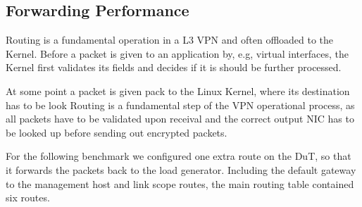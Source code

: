 \documentclass[IN,11pt,twoside,openright,master,english]{tumthesis}
\begin{document}
\subsection{Forwarding Performance}

Routing is a fundamental operation in a L3 VPN and often offloaded to the Kernel. Before a packet is given to an application by, e.g, virtual interfaces, the Kernel first validates its fields and decides if it is should be further processed.

At some point a packet is given pack to the Linux Kernel, where its destination has to be look
Routing is a fundamental step of the VPN operational process, as all packets have to be validated upon receival and the correct output NIC has to be looked up before sending out encrypted packets.

For the following benchmark we configured one extra route on the DuT, so that it forwards the packets back to the load generator. Including the default gateway to the management host and link scope routes, the main routing table contained six routes.
\end{document}
